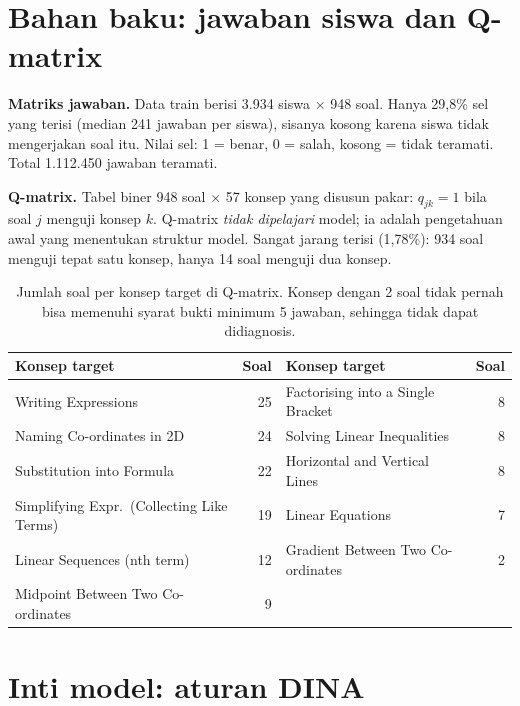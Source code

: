 \documentclass[11pt,a4paper]{article}
\begin{document}
\section{Bahan baku: jawaban siswa dan Q-matrix}

\textbf{Matriks jawaban.} Data train berisi 3.934 siswa $\times$ 948 soal. Hanya 29,8\% sel yang terisi (median
241 jawaban per siswa), sisanya kosong karena siswa tidak mengerjakan soal itu. Nilai sel: 1 = benar, 0 = salah,
kosong = tidak teramati. Total 1.112.450 jawaban teramati.

\textbf{Q-matrix.} Tabel biner 948 soal $\times$ 57 konsep yang disusun pakar: $q_{jk}=1$ bila soal $j$ menguji konsep
$k$. Q-matrix \emph{tidak dipelajari} model; ia adalah pengetahuan awal yang menentukan struktur model. Sangat jarang
terisi (1,78\%): 934 soal menguji tepat satu konsep, hanya 14 soal menguji dua konsep.

\begin{table}[h]
  \centering\small
  \begin{tabular}{@{}lr@{\hspace{2em}}lr@{}}
    \toprule
    Konsep target & Soal & Konsep target & Soal \\
    \midrule
    Writing Expressions & 25 & Factorising into a Single Bracket & 8 \\
    Naming Co-ordinates in 2D & 24 & Solving Linear Inequalities & 8 \\
    Substitution into Formula & 22 & Horizontal and Vertical Lines & 8 \\
    Simplifying Expr.\ (Collecting Like Terms) & 19 & Linear Equations & 7 \\
    Linear Sequences (nth term) & 12 & \textcolor{gapred}{Gradient Between Two Co-ordinates} & \textcolor{gapred}{2} \\
    Midpoint Between Two Co-ordinates & 9 & & \\
    \bottomrule
  \end{tabular}
  \caption{Jumlah soal per konsep target di Q-matrix. Konsep dengan 2 soal tidak pernah bisa memenuhi syarat bukti
  minimum 5 jawaban, sehingga tidak dapat didiagnosis.}
\end{table}

\section{Inti model: aturan DINA}
\end{document}

